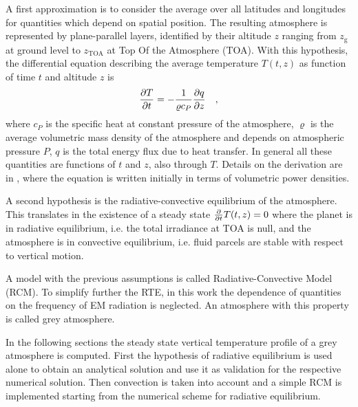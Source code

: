 \documentclass[a4paper,10pt,twocolumn,\classoptions]{article}
\newcommand{\zTOA}{z_\text{TOA}}
\begin{document}
A first approximation is to consider the average over all latitudes and longitudes for quantities which depend on spatial position. The resulting atmosphere is represented by plane-parallel layers, identified by their altitude $z$ ranging from $z_\text{g}$ at ground level to $\zTOA$ at Top Of the Atmosphere (TOA). With this hypothesis, the differential equation describing the average temperature $T(t,z)$ as function of time $t$ and altitude $z$ is
\begin{equation}
  \label{eq:temperature_derivation}
  \pdv{T}{t} = -\frac{1}{\varrho c_P} \pdv{q}{z}
  \quad ,
\end{equation}
where $c_P$ is the specific heat at constant pressure of the atmosphere, $\varrho$ is the average volumetric mass density of the atmosphere and depends on atmospheric pressure $P$, $q$ is the total energy flux due to heat transfer. In general all these quantities are functions of $t$ and $z$, also through $T$. Details on the derivation are in \cite[466]{Ramanathan}, where the equation is written initially in terms of volumetric power densities.

A second hypothesis is the radiative-convective equilibrium of the atmosphere. This translates in the existence of a steady state $\pdv*{T(t,z)}{t} = 0$ where the planet is in radiative equilibrium, i.e. the total irradiance at TOA is null, and the atmosphere is in convective equilibrium, i.e. fluid parcels are stable with respect to vertical motion.

A model with the previous assumptions is called Radiative-Convective Model (RCM).
To simplify further the RTE, in this work the dependence of quantities on the frequency of EM radiation is neglected. An atmosphere with this property is called grey atmosphere.

In the following sections the steady state vertical temperature profile of a grey atmosphere is computed. First the hypothesis of radiative equilibrium is used alone to obtain an analytical solution and use it as validation for the respective numerical solution. Then convection is taken into account and a simple RCM is implemented starting from the numerical scheme for radiative equilibrium.
\end{document}
